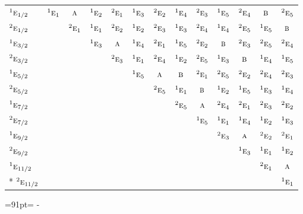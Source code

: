 \documentclass[10pt,a4paper]{article}
\newcommand{\needspace}[1]{\par\penalty-100\begingroup\dimen0=#1\relax\dimen2=\pagegoal
  \advance\dimen2-\pagetotal\ifdim\dimen0>\dimen2\relax\ifdim\dimen2>0pt\vfil\break\fi\fi
  \endgroup}
\numberwithin{equation}{section}
\newcommand{\irr}[1]{\text{\normalfont\scshape #1}}
\newcommand{\conjpair}[1]{{}^{#1}}
\begin{document}
{\begin{longtable}{@{}lcccccccccccc@{}}
$\conjpair{1}\irr{e}_{1/2}$ & $\conjpair{1}\irr{e}_{1}$ & $\irr{a}$ & $\conjpair{1}\irr{e}_{2}$ & $\conjpair{2}\irr{e}_{1}$ & $\conjpair{1}\irr{e}_{3}$ & $\conjpair{2}\irr{e}_{2}$ & $\conjpair{1}\irr{e}_{4}$ & $\conjpair{2}\irr{e}_{3}$ & $\conjpair{1}\irr{e}_{5}$ & $\conjpair{2}\irr{e}_{4}$ & $\irr{b}$ & $\conjpair{2}\irr{e}_{5}$\\
$\conjpair{2}\irr{e}_{1/2}$ &  & $\conjpair{2}\irr{e}_{1}$ & $\conjpair{1}\irr{e}_{1}$ & $\conjpair{2}\irr{e}_{2}$ & $\conjpair{1}\irr{e}_{2}$ & $\conjpair{2}\irr{e}_{3}$ & $\conjpair{1}\irr{e}_{3}$ & $\conjpair{2}\irr{e}_{4}$ & $\conjpair{1}\irr{e}_{4}$ & $\conjpair{2}\irr{e}_{5}$ & $\conjpair{1}\irr{e}_{5}$ & $\irr{b}$\\
$\conjpair{1}\irr{e}_{3/2}$ &  &  & $\conjpair{1}\irr{e}_{3}$ & $\irr{a}$ & $\conjpair{1}\irr{e}_{4}$ & $\conjpair{2}\irr{e}_{1}$ & $\conjpair{1}\irr{e}_{5}$ & $\conjpair{2}\irr{e}_{2}$ & $\irr{b}$ & $\conjpair{2}\irr{e}_{3}$ & $\conjpair{2}\irr{e}_{5}$ & $\conjpair{2}\irr{e}_{4}$\\
$\conjpair{2}\irr{e}_{3/2}$ &  &  &  & $\conjpair{2}\irr{e}_{3}$ & $\conjpair{1}\irr{e}_{1}$ & $\conjpair{2}\irr{e}_{4}$ & $\conjpair{1}\irr{e}_{2}$ & $\conjpair{2}\irr{e}_{5}$ & $\conjpair{1}\irr{e}_{3}$ & $\irr{b}$ & $\conjpair{1}\irr{e}_{4}$ & $\conjpair{1}\irr{e}_{5}$\\
$\conjpair{1}\irr{e}_{5/2}$ &  &  &  &  & $\conjpair{1}\irr{e}_{5}$ & $\irr{a}$ & $\irr{b}$ & $\conjpair{2}\irr{e}_{1}$ & $\conjpair{2}\irr{e}_{5}$ & $\conjpair{2}\irr{e}_{2}$ & $\conjpair{2}\irr{e}_{4}$ & $\conjpair{2}\irr{e}_{3}$\\
$\conjpair{2}\irr{e}_{5/2}$ &  &  &  &  &  & $\conjpair{2}\irr{e}_{5}$ & $\conjpair{1}\irr{e}_{1}$ & $\irr{b}$ & $\conjpair{1}\irr{e}_{2}$ & $\conjpair{1}\irr{e}_{5}$ & $\conjpair{1}\irr{e}_{3}$ & $\conjpair{1}\irr{e}_{4}$\\
$\conjpair{1}\irr{e}_{7/2}$ &  &  &  &  &  &  & $\conjpair{2}\irr{e}_{5}$ & $\irr{a}$ & $\conjpair{2}\irr{e}_{4}$ & $\conjpair{2}\irr{e}_{1}$ & $\conjpair{2}\irr{e}_{3}$ & $\conjpair{2}\irr{e}_{2}$\\
$\conjpair{2}\irr{e}_{7/2}$ &  &  &  &  &  &  &  & $\conjpair{1}\irr{e}_{5}$ & $\conjpair{1}\irr{e}_{1}$ & $\conjpair{1}\irr{e}_{4}$ & $\conjpair{1}\irr{e}_{2}$ & $\conjpair{1}\irr{e}_{3}$\\
$\conjpair{1}\irr{e}_{9/2}$ &  &  &  &  &  &  &  &  & $\conjpair{2}\irr{e}_{3}$ & $\irr{a}$ & $\conjpair{2}\irr{e}_{2}$ & $\conjpair{2}\irr{e}_{1}$\\
$\conjpair{2}\irr{e}_{9/2}$ &  &  &  &  &  &  &  &  &  & $\conjpair{1}\irr{e}_{3}$ & $\conjpair{1}\irr{e}_{1}$ & $\conjpair{1}\irr{e}_{2}$\\
$\conjpair{1}\irr{e}_{11/2}$ &  &  &  &  &  &  &  &  &  &  & $\conjpair{2}\irr{e}_{1}$ & $\irr{a}$\\*
$\conjpair{2}\irr{e}_{11/2}$ &  &  &  &  &  &  &  &  &  &  &  & $\conjpair{1}\irr{e}_{1}$\\
\bottomrule\end{longtable}}
\needspace{91pt}
\end{document}
